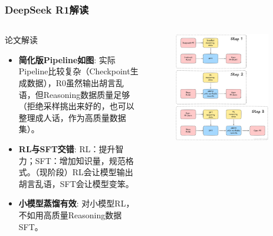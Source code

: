 \documentclass[10pt,aspectratio=169]{beamer}
\begin{document}
\begin{frame}
    \frametitle{DeepSeek R1解读}
    \begin{columns}[T]
        \begin{block}{论文解读}
            \begin{itemize}
                \item \textbf{简化版Pipeline如图}: 实际Pipeline比较复杂（Checkpoint生成数据），R0虽然输出胡言乱语，但Reasoning数据质量足够（拒绝采样挑出来好的，也可以整理成人话，作为高质量数据集）。
                \item \textbf{RL与SFT交错}: RL：提升智力；SFT：增加知识量，规范格式。（现阶段）RL会让模型输出胡言乱语，SFT会让模型变笨。
                \item \textbf{小模型蒸馏有效}: 对小模型RL，不如用高质量Reasoning数据SFT。
            \end{itemize}
        \end{block}
        
        \begin{figure}
            \includegraphics[width=0.9\textwidth]{GRPO/Open R1.png}
        \end{figure}
    \end{columns}
\end{frame}
\end{document}
